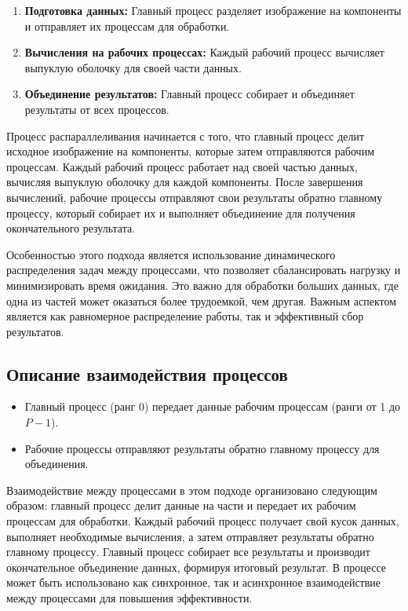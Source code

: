 \documentclass{report}
\begin{document}
\begin{enumerate}
  \item \textbf{Подготовка данных:} Главный процесс разделяет изображение на компоненты и отправляет их процессам для обработки.
  \item \textbf{Вычисления на рабочих процессах:} Каждый рабочий процесс вычисляет выпуклую оболочку для своей части данных.
  \item \textbf{Объединение результатов:} Главный процесс собирает и объединяет результаты от всех процессов.
\end{enumerate}

Процесс распараллеливания начинается с того, что главный процесс делит исходное изображение на компоненты, которые затем отправляются рабочим процессам. Каждый рабочий процесс работает над своей частью данных, вычисляя выпуклую оболочку для каждой компоненты. После завершения вычислений, рабочие процессы отправляют свои результаты обратно главному процессу, который собирает их и выполняет объединение для получения окончательного результата.

Особенностью этого подхода является использование динамического распределения задач между процессами, что позволяет сбалансировать нагрузку и минимизировать время ожидания. Это важно для обработки больших данных, где одна из частей может оказаться более трудоемкой, чем другая. Важным аспектом является как равномерное распределение работы, так и эффективный сбор результатов.

\subsection*{Описание взаимодействия процессов}

\begin{itemize}
  \item Главный процесс (ранг 0) передает данные рабочим процессам (ранги от 1 до \( P-1 \)).
  \item Рабочие процессы отправляют результаты обратно главному процессу для объединения.
\end{itemize}

Взаимодействие между процессами в этом подходе организовано следующим образом: главный процесс делит данные на части и передает их рабочим процессам для обработки. Каждый рабочий процесс получает свой кусок данных, выполняет необходимые вычисления, а затем отправляет результаты обратно главному процессу. Главный процесс собирает все результаты и производит окончательное объединение данных, формируя итоговый результат. В процессе может быть использовано как синхронное, так и асинхронное взаимодействие между процессами для повышения эффективности.
\end{document}
